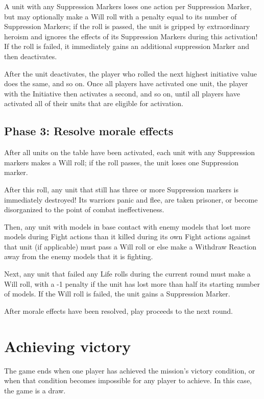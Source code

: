 \begin{multicols}{2}
A unit with any Suppression Markers loses one action per Suppression Marker, but may optionally make a Will roll with a penalty equal to its number of Suppression Markers; if the roll is passed, the unit is gripped by extraordinary heroism and ignores the effects of its Suppression Markers during this activation! If the roll is failed, it immediately gains an additional suppression Marker and then deactivates.

After the unit deactivates, the player who rolled the next highest initiative value does the same, and so on. Once all players have activated one unit, the player with the Initiative then activates a second, and so on, until all players have activated all of their units that are eligible for activation.


\subsection*{Phase 3: Resolve morale effects}

After all units on the table have been activated, each unit with any Suppression markers makes a Will roll; if the roll passes, the unit loses one Suppression marker.

After this roll, any unit that still has three or more Suppression markers is immediately destroyed! Its warriors panic and flee, are taken prisoner, or become disorganized to the point of combat ineffectiveness.

Then, any unit with models in base contact with enemy models that lost more models during Fight actions than it killed during its own Fight actions against that unit (if applicable) must pass a Will roll or else make a Withdraw Reaction away from the enemy models that it is fighting.

Next, any unit that failed any Life rolls during the current round must make a Will roll, with a -1 penalty if the unit has lost more than half its starting number of models. If the Will roll is failed, the unit gains a Suppression Marker.

After morale effects have been resolved, play proceeds to the next round.

\section*{Achieving victory}

The game ends when one player has achieved the mission's victory condition, or when that condition becomes impossible for any player to achieve. In this case, the game is a draw.





\end{multicols}
